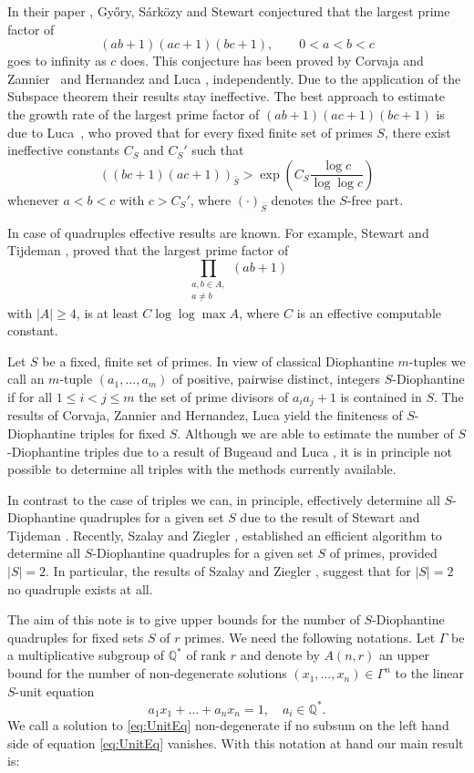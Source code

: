 \documentclass{amsart}
\theoremstyle{remark}
\begin{document}
In their paper \cite{Gyory:1996}, Gy\H{o}ry, S\'ark\"ozy and Stewart conjectured that the largest prime factor of
$$
(ab+1)(ac+1)(bc+1), \qquad 0<a<b<c
$$
goes to infinity as $c$ does. This conjecture has been proved by Corvaja and Zannier~\cite{Corvaja:2003} and Hernandez and Luca 
\cite{Hernandez:2003}, independently. Due to the application of the Subspace theorem their results stay ineffective. The best approach to estimate the growth 
rate of the 
largest prime factor of $(ab+1)(ac+1)(bc+1)$ is due to Luca~\cite{Luca:2005}, who proved that for every fixed finite set of primes $S$, there exist 
ineffective const\-ants $C_{S}$ and $C_{S}'$ such that
$$((bc+1)(ac+1))_{\bar{S}}>\exp\left(C_{S} \frac{\log c}{\log\log c}\right)$$
whenever $a<b<c$ with $c>C_{S}'$, where $(\cdot)_{\bar{S}}$ denotes the $S$-free part.

In case of quadruples effective results are known. For example, Stewart and Tijdeman \cite{Stewart:1997}, proved that the largest prime factor of
$$\prod_{\substack{a,b \in A, \\ a\neq b}} (ab+1)$$
with $|A|\geq 4$, is at least $C \log \log \max A$, where $C$ is an effective computable constant.

Let $S$ be a fixed, finite set of primes. In view of classical Diophantine $m$-tuples we call an $m$-tuple $(a_1,\dots,a_m)$ of positive, pairwise distinct, 
integers $S$-Diophantine if for all $1\leq i <j \leq m$ the set of prime divisors of $a_ia_j+1$ is contained in $S$. The results of Corvaja, Zannier 
\cite{Corvaja:2003} and Hernandez, Luca  \cite{Hernandez:2003} yield the finiteness of $S$-Diophantine triples for fixed $S$. Although we are able to estimate 
the number of $S$-Diophantine triples due to a result of Bugeaud and Luca \cite{Bugeaud:2004a}, it is in principle not possible to determine all triples with 
the methods currently available.

In contrast to the case of triples we can, in principle, effectively determine all $S$-Diophantine quadruples for a given set $S$ due to the result 
of Stewart and Tijdeman \cite{Stewart:1997}. Recently, Szalay and Ziegler \cite{Szalay:2013b}, established an efficient algorithm 
to determine all $S$-Diophantine quadruples for a given set $S$ of primes, provided $|S|=2$. In particular, the results  of Szalay and Ziegler 
\cite{Szalay:2013,Szalay:2013a,Szalay:2013b}, suggest that for $|S|=2$ no quadruple exists at all.

The aim of this note is to give upper bounds for the number of $S$-Diophantine quadruples for fixed sets $S$ of $r$ primes. We need the following 
notations. Let $\Gamma$ be a multiplicative  
subgroup of ${\mathbb{Q}}^*$ of rank $r$ and denote by $A(n,r)$ an upper bound for the number of non-degenerate solutions $(x_1,\ldots,x_n)\in \Gamma^n$ to the linear 
$S$-unit equation
\begin{equation}\label{eq:UnitEq}
a_1x_1+\dots+a_nx_n =1, \quad a_i \in {\mathbb{Q}}^*.
\end{equation} 
We call a solution to \eqref{eq:UnitEq} non-degenerate if no subsum on the left hand side of equation \eqref{eq:UnitEq} vanishes. With 
this notation at hand our main result is:
\end{document}
